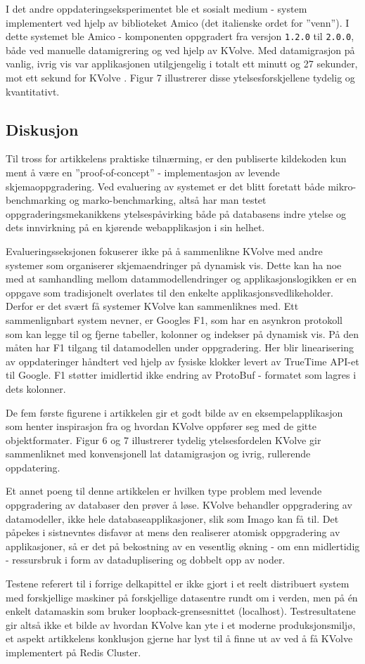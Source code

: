 I det andre oppdateringseksperimentet ble et sosialt medium - system implementert ved hjelp av biblioteket Amico (det italienske ordet for ''venn''). I dette systemet ble Amico - komponenten oppgradert fra versjon \texttt{1.2.0} til \texttt{2.0.0}, både ved manuelle datamigrering og ved hjelp av KVolve. Med datamigrasjon på vanlig, ivrig vis var applikasjonen utilgjengelig i totalt ett minutt og 27 sekunder, mot ett sekund for KVolve \citep{saur2016}. Figur 7 illustrerer disse ytelsesforskjellene tydelig og kvantitativt.

\subsection{Diskusjon}
Til tross for artikkelens praktiske tilnærming, er den publiserte kildekoden kun ment å være en ''proof-of-concept'' - implementasjon av levende skjemaoppgradering. Ved evaluering av systemet er det blitt foretatt både mikro-benchmarking og marko-benchmarking, altså har man testet oppgraderingsmekanikkens ytelsespåvirking både på databasens indre ytelse og dets innvirkning på en kjørende webapplikasjon i sin helhet.

Evalueringsseksjonen fokuserer ikke på å sammenlikne KVolve med andre systemer som organiserer skjemaendringer på dynamisk vis. Dette kan ha noe med at samhandling mellom datammodellendringer og applikasjonslogikken er en oppgave som tradisjonelt overlates til den enkelte applikasjonsvedlikeholder. Derfor er det svært få systemer KVolve kan sammenliknes med. Ett sammenlignbart system \cite{saur2016} nevner, er Googles F1, som har en asynkron protokoll som kan legge til og fjerne tabeller, kolonner og indekser på dynamisk vis. På den måten har F1 tilgang til datamodellen under oppgradering. Her blir linearisering av oppdateringer håndtert ved hjelp av fysiske klokker levert av TrueTime API-et til Google. F1 støtter imidlertid ikke endring av ProtoBuf - formatet som lagres i dets kolonner.

De fem første figurene i artikkelen gir et godt bilde av en eksempelapplikasjon som henter inspirasjon fra \cite{sadalage2013} og hvordan KVolve oppfører seg med de gitte objektformater. Figur 6 og 7 illustrerer tydelig ytelsesfordelen KVolve gir sammenliknet med konvensjonell lat datamigrasjon og ivrig, rullerende oppdatering.

Et annet poeng til denne artikkelen er hvilken type problem med levende oppgradering av databaser den prøver å løse. KVolve behandler oppgradering av datamodeller, ikke hele databaseapplikasjoner, slik som Imago kan få til. Det påpekes i sistnevntes disfavør at mens den realiserer atomisk oppgradering av applikasjoner, så er det på bekostning av en vesentlig økning - om enn midlertidig - ressursbruk i form av dataduplisering og dobbelt opp av noder.

Testene referert til i forrige delkapittel er ikke gjort i et reelt distribuert system med forskjellige maskiner på forskjellige datasentre rundt om i verden, men på én enkelt datamaskin som bruker loopback-grensesnittet (localhost). Testresultatene gir altså ikke et bilde av hvordan KVolve kan yte i et moderne produksjonsmiljø, et aspekt artikkelens konklusjon gjerne har lyst til å finne ut av ved å få KVolve implementert på Redis Cluster.
